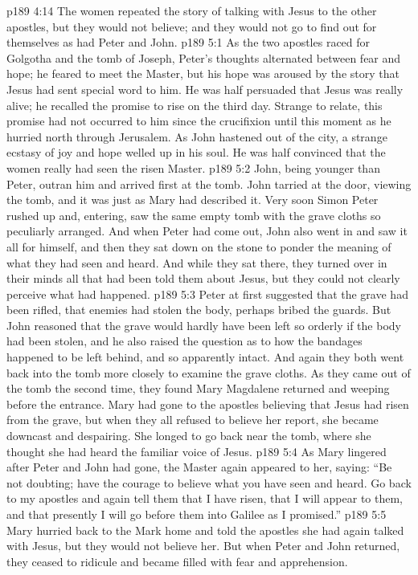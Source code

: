 \vs p189 4:14 The women repeated the story of talking with Jesus to the other apostles, but they would not believe; and they would not go to find out for themselves as had Peter and John.
\vs p189 5:1 As the two apostles raced for Golgotha and the tomb of Joseph, Peter’s thoughts alternated between fear and hope; he feared to meet the Master, but his hope was aroused by the story that Jesus had sent special word to him. He was half persuaded that Jesus was really alive; he recalled the promise to rise on the third day. Strange to relate, this promise had not occurred to him since the crucifixion until this moment as he hurried north through Jerusalem. As John hastened out of the city, a strange ecstasy of joy and hope welled up in his soul. He was half convinced that the women really had seen the risen Master.
\vs p189 5:2 John, being younger than Peter, outran him and arrived first at the tomb. John tarried at the door, viewing the tomb, and it was just as Mary had described it. Very soon Simon Peter rushed up and, entering, saw the same empty tomb with the grave cloths so peculiarly arranged. And when Peter had come out, John also went in and saw it all for himself, and then they sat down on the stone to ponder the meaning of what they had seen and heard. And while they sat there, they turned over in their minds all that had been told them about Jesus, but they could not clearly perceive what had happened.\plusone
\vs p189 5:3 Peter at first suggested that the grave had been rifled, that enemies had stolen the body, perhaps bribed the guards. But John reasoned that the grave would hardly have been left so orderly if the body had been stolen, and he also raised the question as to how the bandages happened to be left behind, and so apparently intact. And again they both went back into the tomb more closely to examine the grave cloths. As they came out of the tomb the second time, they found Mary Magdalene returned and weeping before the entrance. Mary had gone to the apostles believing that Jesus had risen from the grave, but when they all refused to believe her report, she became downcast and despairing. She longed to go back near the tomb, where she thought she had heard the familiar voice of Jesus.
\vs p189 5:4 As Mary lingered after Peter and John had gone, the Master again appeared to her, saying: \textcolor{ubdarkred}{“Be not doubting; have the courage to believe what you have seen and heard. Go back to my apostles and again tell them that I have risen, that I will appear to them, and that presently I will go before them into Galilee as I promised.”}
\vs p189 5:5 Mary hurried back to the Mark home and told the apostles she had again talked with Jesus, but they would not believe her. But when Peter and John returned, they ceased to ridicule and became filled with fear and apprehension.
